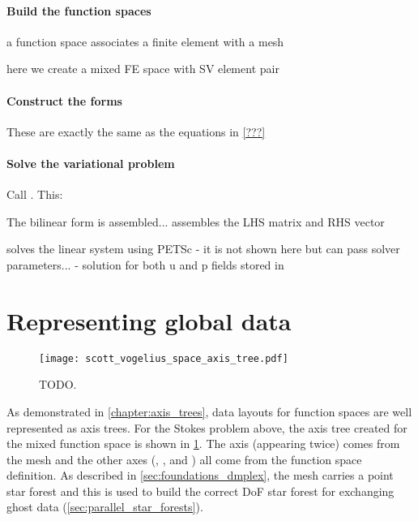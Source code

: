 \documentclass[thesis]{subfiles}
\begin{document}
\paragraph{Build the function spaces}

a function space associates a finite element with a mesh

here we create a mixed FE space with SV element pair

\paragraph{Construct the forms}

These are exactly the same as the equations in \cref{???}

\paragraph{Solve the variational problem}

Call . This:

The bilinear form  is assembled...
assembles the LHS matrix and RHS vector

solves the linear system using PETSc - it is not shown here but can pass solver parameters... - solution for both u and p fields stored in 

\section{Representing global data}


\begin{figure}
  \centering
  \texttt{[image: scott\_vogelius\_space\_axis\_tree.pdf]}
  \caption{
    TODO.
  }
  \label{fig:firedrake_axis_tree}
\end{figure}

As demonstrated in \cref{chapter:axis_trees}, data layouts for function spaces are well represented as axis trees.
For the Stokes problem above, the axis tree created for the mixed function space  is shown in \cref{fig:firedrake_axis_tree}.
The  axis (appearing twice) comes from the mesh and the other axes (, , and ) all come from the function space definition.
As described in \cref{sec:foundations_dmplex}, the mesh carries a point star forest and this is used to build the correct DoF star forest for exchanging ghost data (\cref{sec:parallel_star_forests}).
\end{document}
